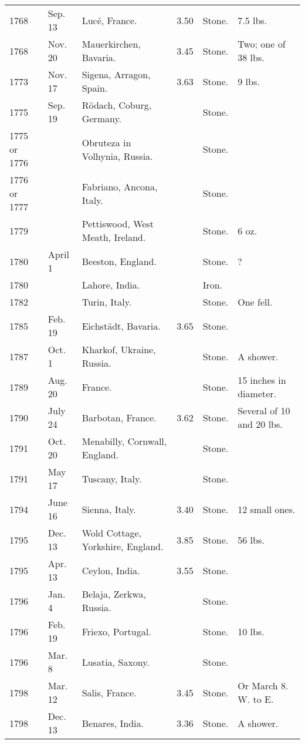 \documentclass[a4paper, 12pt, oneside]{article}
\begin{document}
\begin{center}
\begin{longtable}{|p{10mm}|p{15mm}|p{32mm}|p{13mm}|p{13mm}|p{26mm}|}
        1768 & Sep. 13 & Lucé, France. & 3.50 & Stone. & 7.5 lbs. \\
        1768 & Nov. 20 & Mauerkirchen, Bavaria. & 3.45 & Stone. & Two; one of 38 lbs. \\
        1773 & Nov. 17 & Sigena, Arragon, Spain. & 3.63 & Stone. & 9 lbs. \\
        1775 & Sep. 19 & Rödach, Coburg, Germany. & ~ & Stone. & ~ \\
        1775 or 1776 & ~ & Obruteza in Volhynia, Russia. & ~ & Stone. & ~ \\
        1776 or 1777 & ~ & Fabriano, Ancona, Italy. & ~ & Stone. & ~ \\
        1779 & ~ & Pettiswood, West Meath, Ireland. & ~ & Stone. & 6 oz. \\
        1780 & April 1 & Beeston, England. & ~ & Stone. & ? \\
        1780 & ~ & Lahore, India. & ~ & Iron. & ~ \\
        1782 & ~ & Turin, Italy. & ~ & Stone. & One fell. \\
        1785 & Feb. 19 & Eichstädt, Bavaria. & 3.65 & Stone. & ~ \\
        1787 & Oct. 1 & Kharkof, Ukraine, Russia. & ~ & Stone. & A shower. \\
        1789 & Aug. 20 & France. & ~ & Stone. & 15 inches in diameter. \\
        1790 & July 24 & Barbotan, France. & 3.62 & Stone. & Several of 10 and 20 lbs. \\
        1791 & Oct. 20 & Menabilly, Cornwall, England. & ~ & Stone. & ~ \\
        1791 & May 17 & Tuscany, Italy. & ~ & Stone. & ~ \\
        1794 & June 16 & Sienna, Italy. & 3.40 & Stone. & 12 small ones. \\
        1795 & Dec. 13 & Wold Cottage, Yorkshire, England. & 3.85 & Stone. & 56 lbs. \\
        1795 & Apr. 13 & Ceylon, India. & 3.55 & Stone. & ~ \\
        1796 & Jan. 4 & Belaja, Zerkwa, Russia. & ~ & Stone. & ~ \\
        1796 & Feb. 19 & Friexo, Portugal. & ~ & Stone. & 10 lbs. \\
        1796 & Mar. 8 & Lusatia, Saxony. & ~ & Stone. & ~ \\
        1798 & Mar. 12 & Salis, France. & 3.45 & Stone. & Or March 8. W. to E. \\
        1798 & Dec. 13 & Benares, India. & 3.36 & Stone. & A shower. \\

\end{longtable}
\end{center}
\end{document}
